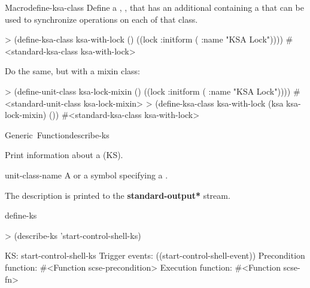 \documentclass[10pt,twoside,english,pdftex]{article}
\begin{document}
\begin{functiondoc}{Macro}{define-ksa-class}
\fnexamples
Define a ,
, that has an additional 
containing a  that can be used to synchronize
operations on each  of that class.
%
\W\supp
\begin{example}
> (define-ksa-class ksa-with-lock ()
    ((lock :initform ( :name "KSA Lock"))))
#<standard-ksa-class ksa-with-lock>
\end{example}
%
Do the same, but with a mixin class:
%
\W\supp\notpretop
\begin{example}
> (define-unit-class ksa-lock-mixin ()
    ((lock :initform ( :name "KSA Lock"))))
#<standard-unit-class ksa-lock-mixin>
> (define-ksa-class ksa-with-lock (ksa ksa-lock-mixin)
    ())
#<standard-ksa-class ksa-with-lock>
\end{example}

\end{functiondoc}


\begin{functiondoc}{Generic~Function}{describe-ks}%
  {}
%
%

\fnsyntax

\fnpurpose
Print information about a  (KS).
 
\fnmethods
{}

\fnpackage {}

\fnmodule {}

\fnargs
\begin{args}{unit-class-name}
   A  or a symbol specifying a
  .
\end{args}

\fndescription
{}%
The description is printed to the {\bf *standard-output*} stream.

\begin{alsos}{define-ks}
\also[define-ks]
\also[ks]
\end{alsos}

\fnexample
%
\W\supp
\begin{example}
> (describe-ks 'start-control-shell-ks)

KS: start-control-shell-ks
  Trigger events:        ((start-control-shell-event))
  Precondition function: #<Function scse-precondition>
  Execution function:    #<Function scse-fn>
\end{example}

\end{functiondoc}
\end{document}
